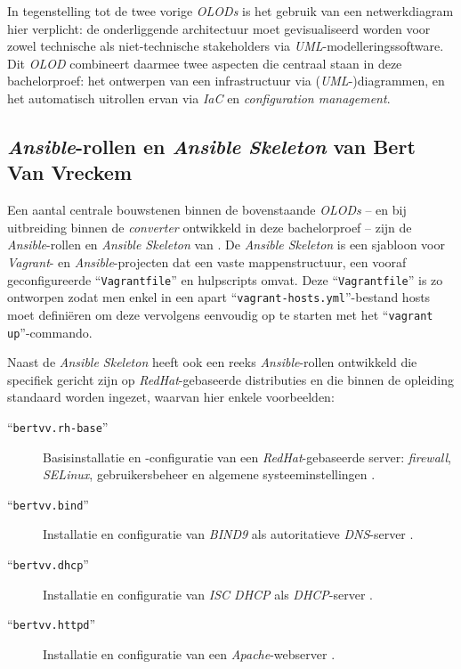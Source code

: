 In tegenstelling tot de twee vorige \emph{OLODs} is het gebruik van een netwerkdiagram hier verplicht: de onderliggende architectuur moet gevisualiseerd worden voor zowel technische als niet-technische stakeholders via \emph{UML}-modelleringssoftware. Dit \emph{OLOD} combineert daarmee twee aspecten die centraal staan in deze bachelorproef: het ontwerpen van een infrastructuur via (\emph{UML}-)diagrammen, en het automatisch uitrollen ervan via \emph{IaC} en \emph{configuration management}.

\subsection{\emph{Ansible}-rollen en \emph{Ansible Skeleton} van Bert Van Vreckem}%
\label{subsec:bertvv}

Een aantal centrale bouwstenen binnen de bovenstaande \emph{OLODs} -- en bij uitbreiding binnen de \emph{converter} ontwikkeld in deze bachelorproef -- zijn de \emph{Ansible}-rollen en \emph{Ansible Skeleton} van \textcite{Vreckem2025}.
De \emph{Ansible Skeleton} is een sjabloon voor \emph{Vagrant}- en \emph{Ansible}-projecten dat een vaste mappenstructuur, een vooraf geconfigureerde ``\texttt{Vagrantfile}'' en hulpscripts omvat. Deze ``\texttt{Vagrantfile}'' is zo ontworpen zodat men enkel in een apart ``\texttt{vagrant-hosts.yml}''-bestand hosts moet definiëren om deze vervolgens eenvoudig op te starten met het ``\texttt{vagrant up}''-commando.

Naast de \emph{Ansible Skeleton} heeft \textcite{Vreckem2016} ook een reeks \emph{Ansible}-rollen ontwikkeld die specifiek gericht zijn op \emph{RedHat}-gebaseerde distributies en die binnen de opleiding standaard worden ingezet, waarvan hier enkele voorbeelden:

\begin{description}
  \item[``\texttt{bertvv.rh-base}''] Basisinstallatie en -configuratie van een \emph{RedHat}-gebaseerde server: \emph{firewall}, \emph{SELinux}, gebruikersbeheer en algemene systeeminstellingen \autocite{Vreckem2016}.
  \item[``\texttt{bertvv.bind}''] Installatie en configuratie van \emph{BIND9} als autoritatieve \emph{DNS}-server \autocite{Vreckem2015}.
  \item[``\texttt{bertvv.dhcp}''] Installatie en configuratie van \emph{ISC DHCP} als \emph{DHCP}-server \autocite{Vreckem2015a}.
  \item[``\texttt{bertvv.httpd}''] Installatie en configuratie van een \emph{Apache}-webserver \autocite{Vreckem2015b}.
\end{description}

